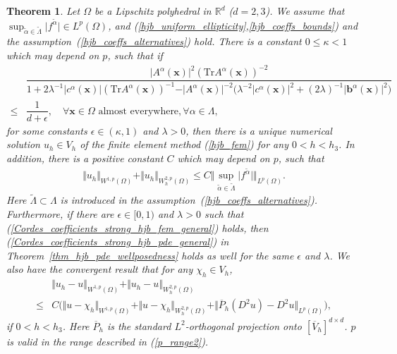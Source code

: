 \documentclass[12pt]{amsart}
\newcommand{\boldx}{\boldsymbol{x}}
\newtheorem{theorem}{Theorem}[section]
\theoremstyle{definition}
\theoremstyle{remark}
\begin{document}
\begin{theorem}
\label{thm_hjb_conv}
Let $\Omega$ be a Lipschitz polyhedral in $\mathbb{R}^{d}$ ($d=2,3$). 
We assume that $\sup_{\tilde{\alpha}\in \tilde{\Lambda}}\vert f^{\tilde{\alpha}}\vert 
\in L^{p}(\Omega)$, and (\ref{hjb_uniform_ellipticity},\ref{hjb_coeffs_bounds}) 
and the assumption~(\ref{hjb_coeffs_alternatives}) hold.
There is a constant $0 \leq \kappa<1$ 
which may depend on $p$, such that if 
\begin{align}
\label{Cordes_coefficients_strong_hjb_fem_general}
& \dfrac{\vert A^{\alpha}(\boldx)\vert^{2}(\text{Tr} A^{\alpha}
(\boldx))^{-2}}{1 + 2\lambda^{-1}\vert c^{\alpha}(\boldx)\vert
(\text{Tr}A^{\alpha}(\boldx))^{-1}
- \vert A^{\alpha}(\boldx)\vert^{-2}
\big( \lambda^{-2} \vert c^{\alpha}(\boldx)\vert^{2} 
+ (2\lambda)^{-1}\vert \boldsymbol{b}^{\alpha}(\boldx)\vert^{2}\big)} \\
\nonumber 
\leq & \dfrac{1}{d + \epsilon}, \quad
\forall \boldx \in \Omega \text{ almost everywhere},
\forall \alpha \in \Lambda,
\end{align}
for some constants $\epsilon \in (\kappa,1)$ and $\lambda > 0$, then 
there is a unique numerical 
solution $u_{h}\in V_{h}$ of the finite element method (\ref{hjb_fem}) for any 
$0< h < h_{3}$.
In addition, there is a positive constant $C$ which may depend on $p$, such that 
\begin{align*}
\Vert u_{h}\Vert_{W^{1,p}(\Omega)}+ \Vert u_{h}\Vert_{W^{2,p}_{h}(\Omega)} 
\leq C \Vert \sup_{\tilde{\alpha}\in \tilde{\Lambda}}\vert f^{\tilde{\alpha}}\vert 
\Vert_{L^{p}(\Omega)}.
\end{align*}
Here $\tilde{\Lambda}\subset \Lambda$ is introduced in the 
assumption~(\ref{hjb_coeffs_alternatives}). Furthermore, if there are 
$\epsilon \in [0,1)$ and $\lambda>0$ such that (\ref{Cordes_coefficients_strong_hjb_fem_general}) holds, then 
(\ref{Cordes_coefficients_strong_hjb_pde_general}) in Theorem~\ref{thm_hjb_pde_wellposedness} holds as well for the same 
$\epsilon$ and $\lambda$. We also have the convergent result that 
for any $\chi_{h}\in V_{h}$, 
\begin{align}
\label{hjb_fem_con_ineq}
& \Vert u_{h} - u\Vert_{W^{1,p}(\Omega)} + \Vert u_{h} - u\Vert_{W_{h}^{2,p}(\Omega)} \\ 
\nonumber
\leq & C \big(\Vert u - \chi_{h}\Vert_{W^{1,p}(\Omega)} + \Vert u - \chi_{h}\Vert_{W_{h}^{2,p}(\Omega)} 
+ \Vert \overline{P}_{h}(D^{2}u) - D^{2}u\Vert_{L^{p}(\Omega)} \big),
\end{align}
if $0 < h < h_{3}$. Here $\overline{P}_{h}$ is the standard $L^{2}$-orthogonal projection 
onto $[\overline{V}_{h}]^{d\times d}$. 
$p$ is valid in the range described in (\ref{p_range2}).
\end{theorem}
\end{document}
